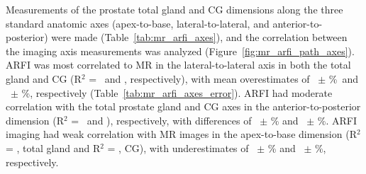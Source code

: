 Measurements of the prostate total gland and CG dimensions along the three
standard anatomic axes (apex-to-base, lateral-to-lateral, and
anterior-to-posterior) were made (Table~\ref{tab:mr_arfi_axes}), and the
correlation between the imaging axis measurements was analyzed
(Figure~\ref{fig:mr_arfi_path_axes}).  ARFI was most correlated to MR in the
lateral-to-lateral axis in both the total gland and CG (R$^2$ =
\totalLatLatRsq~and \centralLatLatRsq, respectively), with mean overestimates
of \ARFImrTotalLatLatMeanPct~$\pm$ \ARFImrTotalLatLatStdPct\%~and
\ARFImrCentralLatLatMeanPct~$\pm$ \ARFImrCentralLatLatStdPct\%, respectively
(Table~\ref{tab:mr_arfi_axes_error}).  ARFI had moderate correlation with the
total prostate gland and CG axes in the anterior-to-posterior dimension (R$^2$
= \totalAntPostRsq~and \centralAntPostRsq), respectively, with differences of
\ARFImrTotalAntPostMeanPct~$\pm$ \ARFImrTotalAntPostStdPct\% and
\ARFImrCentralAntPostMeanPct~$\pm$ \ARFImrCentralAntPostStdPct\%.  ARFI imaging
had weak correlation with MR images in the apex-to-base dimension (R$^2$ =
\totalApexBaseRsq, total gland and R$^2$ = \centralApexBaseRsq, CG), with
underestimates of \ARFImrTotalApexBaseMeanPct~$\pm$
\ARFImrTotalApexBaseStdPct\% and \ARFImrCentralApexBaseMeanPct~$\pm$
\ARFImrCentralApexBaseStdPct\%, respectively.





%

%

%
